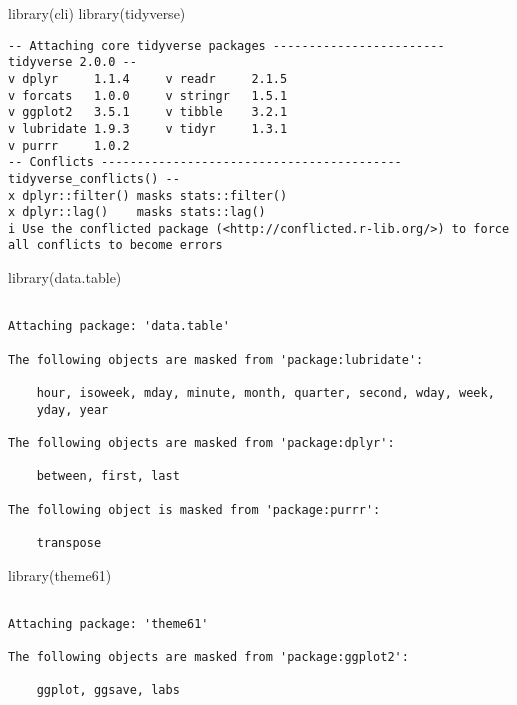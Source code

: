 \documentclass[
  letterpaper,
  DIV=11,
  numbers=noendperiod]{scrreprt}
\newenvironment{Shaded}{\begin{snugshade}}{\end{snugshade}}
\newcommand{\FunctionTok}[1]{\textcolor[rgb]{0.28,0.35,0.67}{#1}}
\newcommand{\NormalTok}[1]{\textcolor[rgb]{0.00,0.23,0.31}{#1}}
\begin{document}
\begin{Shaded}
\begin{Highlighting}[]
\FunctionTok{library}\NormalTok{(cli)}
\FunctionTok{library}\NormalTok{(tidyverse)}
\end{Highlighting}
\end{Shaded}

\begin{verbatim}
-- Attaching core tidyverse packages ------------------------ tidyverse 2.0.0 --
v dplyr     1.1.4     v readr     2.1.5
v forcats   1.0.0     v stringr   1.5.1
v ggplot2   3.5.1     v tibble    3.2.1
v lubridate 1.9.3     v tidyr     1.3.1
v purrr     1.0.2     
-- Conflicts ------------------------------------------ tidyverse_conflicts() --
x dplyr::filter() masks stats::filter()
x dplyr::lag()    masks stats::lag()
i Use the conflicted package (<http://conflicted.r-lib.org/>) to force all conflicts to become errors
\end{verbatim}

\begin{Shaded}
\begin{Highlighting}[]
\FunctionTok{library}\NormalTok{(data.table)}
\end{Highlighting}
\end{Shaded}

\begin{verbatim}

Attaching package: 'data.table'

The following objects are masked from 'package:lubridate':

    hour, isoweek, mday, minute, month, quarter, second, wday, week,
    yday, year

The following objects are masked from 'package:dplyr':

    between, first, last

The following object is masked from 'package:purrr':

    transpose
\end{verbatim}

\begin{Shaded}
\begin{Highlighting}[]
\FunctionTok{library}\NormalTok{(theme61)}
\end{Highlighting}
\end{Shaded}

\begin{verbatim}

Attaching package: 'theme61'

The following objects are masked from 'package:ggplot2':

    ggplot, ggsave, labs
\end{verbatim}
\end{document}
